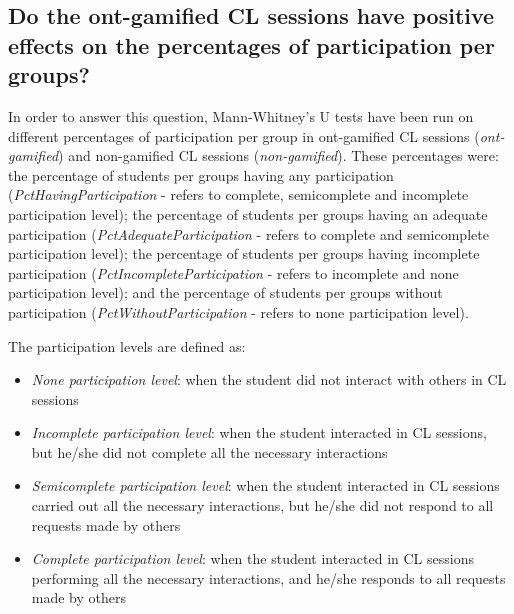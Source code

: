 \subsection*{Do the ont-gamified CL sessions have positive effects on the percentages of participation per groups?}

In order to answer this question, Mann-Whitney's U tests have been run on  different percentages of participation per group in ont-gamified CL sessions (\emph{ont-gamified}) and non-gamified CL sessions (\emph{non-gamified}). These percentages were:
the percentage of students per groups having any participation (\emph{PctHavingParticipation} - refers to complete, semicomplete and incomplete participation level);
the percentage of students per groups having an adequate participation (\emph{PctAdequateParticipation} - refers to complete and semicomplete participation level);
the percentage of students per groups having incomplete participation (\emph{PctIncompleteParticipation} - refers to incomplete and none participation level); and
the percentage of students per groups without participation (\emph{PctWithoutParticipation} - refers to none participation level).

The participation levels are defined as:
\begin{itemize}
\item
\emph{None participation level}: when the student did not interact with others in CL sessions
\item
\emph{Incomplete participation level}: when the student interacted in CL sessions, but he/she did not complete all the necessary interactions
\item
\emph{Semicomplete participation level}: when the student interacted in CL sessions carried out all the necessary interactions, but he/she did not respond to all requests made by others
\item
\emph{Complete participation level}: when the student interacted in CL sessions performing all the necessary interactions, and he/she responds to all requests made by others
\end{itemize}

